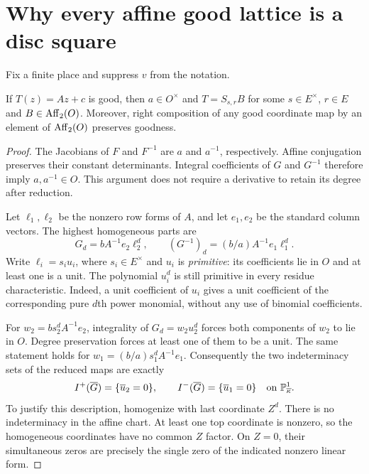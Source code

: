\section{Why every affine good lattice is a disc square}\label{sec:rigidity}

Fix a finite place and suppress $v$ from the notation.
\begin{lemma}\label{lem:rigidity}
If $T(z)=Az+c$ is good, then $a\in O^\times$ and
$T=S_{s,r}B$ for some $s\in E^\times$, $r\in E$ and
$B\in\operatorname{Aff}_2(O)$. Moreover, right composition of any good coordinate
map by an element of $\operatorname{Aff}_2(O)$ preserves goodness.
\end{lemma}
\begin{proof}
The Jacobians of $F$ and $F^{-1}$ are $a$ and $a^{-1}$, respectively.
Affine conjugation preserves their constant determinants. Integral
coefficients of $G$ and $G^{-1}$ therefore imply $a,a^{-1}\in O$.
This argument does not require a derivative to retain its degree
after reduction.

Let $\ell_1,\ell_2$ be the nonzero row forms of $A$, and let $e_1,e_2$
be the standard column vectors. The highest homogeneous parts are
\begin{equation}\label{eq:topterms}
 G_d=b A^{-1}e_2\ell_2^d,\qquad
 (G^{-1})_d=(b/a)A^{-1}e_1\ell_1^d.
\end{equation}
Write $\ell_i=s_i u_i$, where $s_i\in E^\times$ and $u_i$ is
\emph{primitive}: its coefficients lie in $O$ and at least one is a
unit. The polynomial $u_i^d$ is still primitive in every residue
characteristic. Indeed, a unit coefficient of $u_i$ gives a unit
coefficient of the corresponding pure $d$th power monomial, without
any use of binomial coefficients.

For $w_2=bs_2^d A^{-1}e_2$, integrality of $G_d=w_2u_2^d$ forces
both components of $w_2$ to lie in $O$. Degree preservation forces
at least one of them to be a unit. The same statement holds for
$w_1=(b/a)s_1^d A^{-1}e_1$. Consequently the two indeterminacy sets
of the reduced maps are exactly
\begin{equation}\label{eq:indeterminacy}
 I^+(\overline G)=\{\overline u_2=0\},\qquad
 I^-(\overline G)=\{\overline u_1=0\}
 \quad\text{on }\mathbb P^1_{\overline\kappa}.
\end{equation}
To justify this description, homogenize with last coordinate $Z^d$.
There is no indeterminacy in the affine chart. At least one top
coordinate is nonzero, so the homogeneous coordinates have no common
$Z$ factor. On $Z=0$, their simultaneous zeros are precisely the
single zero of the indicated nonzero linear form.


\end{proof}
